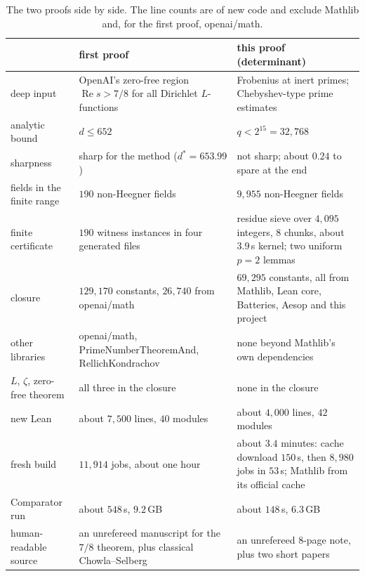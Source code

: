 \documentclass[11pt]{article}
\theoremstyle{definition}
\newcommand{\re}{\operatorname{Re}}
\begin{document}
\begin{table}[h]
\centering\small
\begin{tabular}{p{3.6cm}p{5.4cm}p{5.4cm}}
\toprule
 & first proof & this proof (determinant) \\
\midrule
deep input & OpenAI's zero-free region $\re s > 7/8$ for all Dirichlet $L$-functions & Frobenius at inert primes; Chebyshev-type prime estimates \\
analytic bound & $d \le 652$ & $q < 2^{15} = 32{,}768$ \\
sharpness & sharp for the method ($d^* = 653.99$) & not sharp; about $0.24$ to spare at the end \\
fields in the finite range & $190$ non-Heegner fields & $9{,}955$ non-Heegner fields \\
finite certificate & $190$ witness instances in four generated files & residue sieve over $4{,}095$ integers, $8$ chunks, about $3.9$\,s kernel; two uniform $p = 2$ lemmas \\
closure & $129{,}170$ constants, $26{,}740$ from openai/math & $69{,}295$ constants, all from Mathlib, Lean core, Batteries, Aesop and this project \\
other libraries & openai/math, PrimeNumberTheoremAnd, RellichKondrachov & none beyond Mathlib's own dependencies \\
$L$, $\zeta$, zero-free theorem & all three in the closure & none in the closure \\
new Lean & about $7{,}500$ lines, $40$ modules & about $4{,}000$ lines, $42$ modules \\
fresh build & $11{,}914$ jobs, about one hour & about $3.4$ minutes: cache download $150$\,s, then $8{,}980$ jobs in $53$\,s; Mathlib from its official cache \\
Comparator run & about $548$\,s, $9.2$\,GB & about $148$\,s, $6.3$\,GB \\
human-readable source & an unrefereed manuscript for the $7/8$ theorem, plus classical Chowla--Selberg & an unrefereed $8$-page note, plus two short papers \\
\bottomrule
\end{tabular}
\caption{The two proofs side by side. The line counts are of new code and exclude Mathlib and, for the first proof, openai/math.}
\label{tab:compare}
\end{table}
\end{document}
